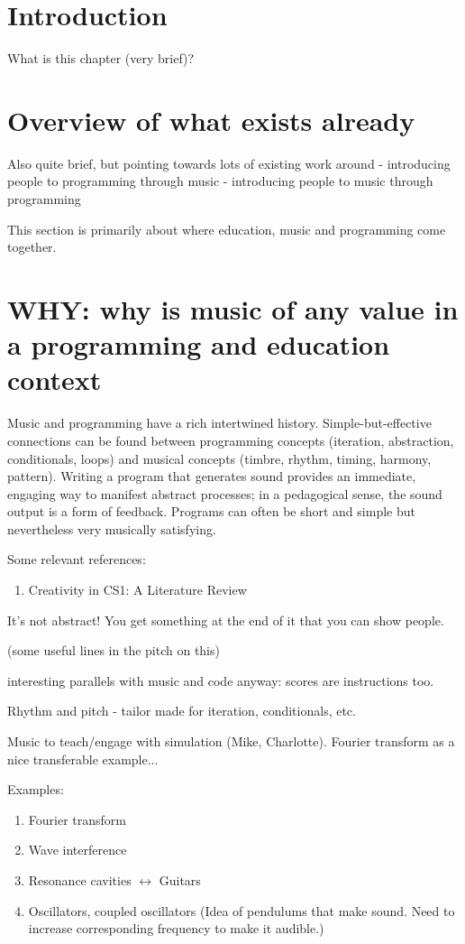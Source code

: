 \section{Introduction}
What is this chapter (very brief)?

\section{Overview of what exists already}
Also quite brief, but pointing towards lots of existing work around
 - introducing people to programming through music
 - introducing people to music through programming

 This section is primarily about where education, music and programming come together.

 

\section{WHY: why is music of any value in a programming and education context}

Music and programming have a rich intertwined history. Simple-but-effective connections can be found between programming concepts (iteration, abstraction, conditionals, loops) and musical concepts (timbre, rhythm, timing, harmony, pattern). Writing a program that generates sound provides an immediate, engaging way to manifest abstract processes; in a pedagogical sense, the sound output is a form of feedback. Programs can often be short and simple but nevertheless very musically satisfying. 

Some relevant references:
\begin{enumerate}
\item Creativity in CS1: A Literature Review\cite{Sharmin2021}
\end{enumerate}

It's not abstract! You get something at the end of it that you can show people.

(some useful lines in the pitch on this)

interesting parallels with music and code anyway: scores are instructions too.

Rhythm and pitch - tailor made for iteration, conditionals, etc.

Music to teach/engage with simulation (Mike, Charlotte). Fourier transform as a nice transferable example...

Examples:
\begin{enumerate}
    \item Fourier transform
    \item Wave interference
    \item Resonance cavities $\leftrightarrow{}$ Guitars
    \item Oscillators, coupled oscillators (Idea of pendulums that make sound. Need to increase corresponding frequency to make it audible.)
\end{enumerate}


